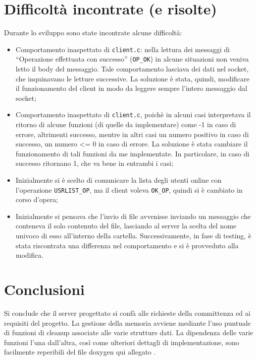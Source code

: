 \documentclass[12pt,a4paper]{article}
\begin{document}
							
\section{Difficoltà incontrate (e risolte)}
Durante lo sviluppo sono state incontrate alcune difficoltà:
\begin{itemize}
\item Comportamento inaspettato di {\tt client.c}: nella lettura dei messaggi di ``Operazione effettuata con successo'' ({\tt OP\_OK}) in alcune situazioni non veniva letto il body del messaggio. Tale comportamento lasciava dei dati nel socket, che inquinavano le letture successive. La soluzione è stata, quindi, modificare il funzionamento del client in modo da leggere sempre l'intero messaggio dal socket;
\item Comportamento inaspettato di {\tt client.c}, poichè in alcuni casi interpretava il ritorno di alcune funzioni (di quelle da implementare) come -1 in caso di errore, altrimenti successo, mentre in altri casi un numero positivo in caso di successo, un numero <= 0 in caso di errore. La soluzione è stata cambiare il funzionamento di tali funzioni da me implementate. In particolare, in caso di successo ritornano 1, che va bene in entrambi i casi;
\item Inizialmente si è scelto di comunicare la lista degli utenti online con l'operazione {\tt USRLIST\_OP}, ma il client voleva {\tt OK\_OP}, quindi si è cambiato in corso d'opera;
\item Inizialmente si pensava che l'invio di file avvenisse inviando un messaggio che conteneva il solo contenuto del file, lasciando al server la scelta del nome univoco di esso all'interno della cartella. Successivamente, in fase di testing, è stata riscontrata una differenza nel comportamento e si è provveduto alla modifica.
\end{itemize}

							
\section{Conclusioni}
Si conclude che il server progettato si confà alle richieste della committenza ed ai requisiti del progetto. La gestione della memoria avviene mediante l'uso puntuale di funzioni di cleanup associate alle varie strutture dati. La dipendenza delle varie funzioni l'una dall'altra, così come ulteriori dettagli di implementazione, sono facilmente reperibili del file doxygen qui allegato .
\end{document}
